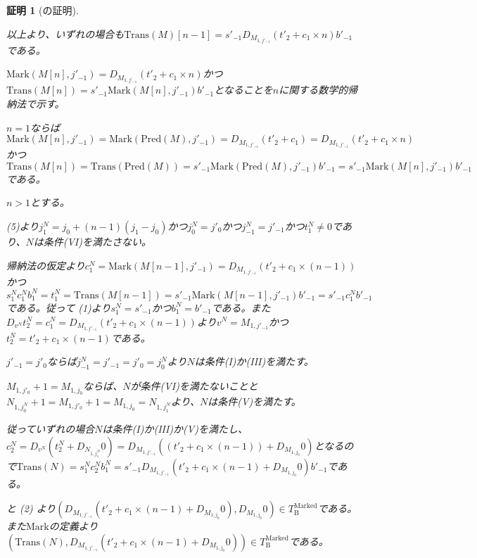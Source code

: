 \documentclass[dvipdfmx,uplatex]{jsarticle}
\theoremstyle{customnonumberbreakfortheorem}
\theoremstyle{customnonumberbreakforproof}
\newtheorem{hideableproof}{証明}
\begin{document}
\begin{hideableproof}[の証明]
\begin{indented}
\begin{indented}
\begin{indented}
\begin{indented}
				\end{indented}
				\item 以上より、いずれの場合も\(\textrm{Trans}(M)[n-1] = s'_{-1} D_{M_{1,j'_{-1}}}(t'_2 + c_1 \times n) b'_{-1}\)である。
				\item \(\textrm{Mark}(M[n],j'_{-1}) = D_{M_{1,j'_{-1}}}(t'_2 + c_1 \times n)\)かつ\(\textrm{Trans}(M[n]) = s'_{-1} \textrm{Mark}(M[n],j'_{-1}) b'_{-1}\)となることを\(n\)に関する数学的帰納法で示す。
				\item \(n = 1\)ならば\(\textrm{Mark}(M[n],j'_{-1}) = \textrm{Mark}(\textrm{Pred}(M),j'_{-1}) = D_{M_{1,j'_{-1}}}(t'_2+c_1) = D_{M_{1,j'_{-1}}}(t'_2 + c_1 \times n)\)かつ\(\textrm{Trans}(M[n]) = \textrm{Trans}(\textrm{Pred}(M)) = s'_{-1} \textrm{Mark}(\textrm{Pred}(M),j'_{-1}) b'_{-1} = s'_{-1} \textrm{Mark}(M[n],j'_{-1}) b'_{-1}\)である。
				\item \(n > 1\)とする。
				\begin{indented}
					\item {} (5)より\(j_1^N = j_0+(n-1)(j_1-j_0)\)かつ\(j_0^N = j'_0\)かつ\(j_{-1}^N = j'_{-1}\)かつ\(t_1^N \neq 0\)であり、\(N\)は条件(VI)を満たさない。
					\item 帰納法の仮定より\(c_1^N = \textrm{Mark}(M[n-1],j'_{-1}) = D_{M_{1,j'_{-1}}}(t'_2 + c_1 \times (n-1))\)かつ\(s_1^N c_1^N b_1^N = t_1^N = \textrm{Trans}(M[n-1]) = s'_{-1} \textrm{Mark}(M[n-1],j'_{-1}) b'_{-1} = s'_{-1} c_1^N b'_{-1}\)である。従って (1)より\(s_1^N = s'_{-1}\)かつ\(b_1^N = b'_{-1}\)である。また\(D_{v^N} t_2^N = c_1^N = D_{M_{1,j'_{-1}}}(t'_2 + c_1 \times (n-1))\)より\(v^N = M_{1,j'_{-1}}\)かつ\(t_2^N = t'_2 + c_1 \times (n-1)\)である。
					\item \(j'_{-1} = j'_0\)ならば\(j_{-1}^N = j'_{-1} = j'_0 = j_0^N\)より\(N\)は条件(I)か(III)を満たす。
					\item \(M_{1,j'_0}+1 = M_{1,j_0}\)ならば、\(N\)が条件(VI)を満たないことと\(N_{1,j_0^N}+1 = M_{1,j'_0}+1 = M_{1,j_0} = N_{1,j_1^N}\)より、\(N\)は条件(V)を満たす。
					\item 従っていずれの場合\(N\)は条件(I)か(III)か(V)を満たし、\(c_2^N = D_{v^N}(t_2^N + D_{N_{1,j_1^N}} 0) = D_{M_{1,j'_{-1}}}((t'_2 + c_1 \times (n-1)) + D_{M_{1,j_0}} 0)\)となるので\(\textrm{Trans}(N) = s_1^N c_2^N b_1^N = s'_{-1} D_{M_{1,j'_{-1}}}(t'_2 + c_1 \times (n-1) + D_{M_{1,j_0}} 0) b'_{-1}\)である。
					\item {}と (2) より\((D_{M_{1,j'_{-1}}}(t'_2 + c_1 \times (n-1) + D_{M_{1,j_0}} 0),D_{M_{1,j_0}} 0) \in T_{\textrm{B}}^{\textrm{Marked}}\)である。また\(\textrm{Mark}\)の定義より\((\textrm{Trans}(N),D_{M_{1,j'_{-1}}}(t'_2 + c_1 \times (n-1) + D_{M_{1,j_0}} 0)) \in T_{\textrm{B}}^{\textrm{Marked}}\)である。

\end{indented}
\end{indented}
\end{indented}
\end{indented}
\end{hideableproof}
\end{document}
